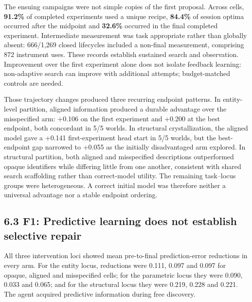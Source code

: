 \documentclass[10pt,twocolumn]{article}
\begin{document}
The ensuing campaigns were not simple copies of the first proposal.
Across cells, \textbf{91.2\%} of completed experiments used a unique
recipe, \textbf{84.4\%} of session optima occurred after the midpoint
and \textbf{32.6\%} occurred in the final completed experiment.
Intermediate measurement was task appropriate rather than globally
absent: 666/1,269 closed lifecycles included a non-final measurement,
comprising 872 instrument uses. These records establish sustained search
and observation. Improvement over the first experiment alone does not
isolate feedback learning: non-adaptive search can improve with
additional attempts; budget-matched controls are needed.

Those trajectory changes produced three recurring endpoint patterns. In
entity-level partition, aligned information produced a durable advantage
over the misspecified arm: +0.106 on the first experiment and +0.200 at
the best endpoint, both concordant in 5/5 worlds. In structural
crystallization, the aligned model gave a +0.141 first-experiment head
start in 5/5 worlds, but the best-endpoint gap narrowed to +0.055 as the
initially disadvantaged arm explored. In structural partition, both
aligned and misspecified descriptions outperformed opaque identifiers
while differing little from one another, consistent with shared search
scaffolding rather than correct-model utility. The remaining task--locus
groups were heterogeneous. A correct initial model was therefore neither
a universal advantage nor a stable endpoint ordering.

\subsection{6.3 F1: Predictive learning does not establish selective
repair}\label{f1-predictive-learning-does-not-establish-selective-repair}

All three intervention loci showed mean pre-to-final prediction-error
reductions in every arm. For the entity locus, reductions were 0.111,
0.097 and 0.097 for opaque, aligned and misspecified cells; for the
parametric locus they were 0.090, 0.033 and 0.065; and for the
structural locus they were 0.219, 0.228 and 0.221. The agent acquired
predictive information during free discovery.
\end{document}
